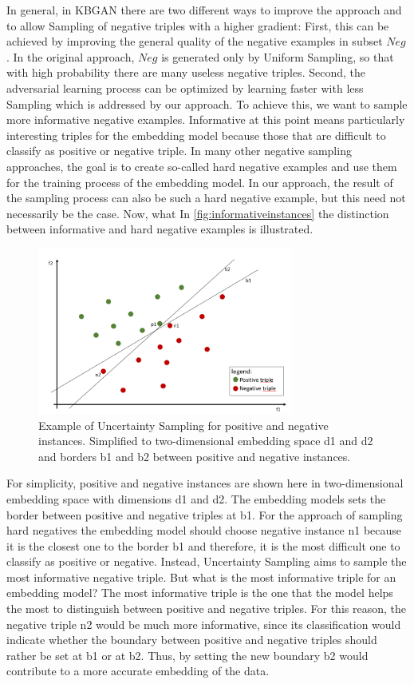 In general, in \ac{KBGAN} there are two different ways to improve the approach and to allow Sampling of negative triples with a higher gradient:
First, this can be achieved by improving the general quality of the negative examples in subset $Neg$.
In the original approach, $Neg$ is generated only by Uniform Sampling, so that with high probability there are many useless negative triples.
Second, the adversarial learning process can be optimized by learning faster with less Sampling which is addressed by our approach.
To achieve this, we want to sample more informative negative examples.
Informative at this point means particularly interesting triples for the embedding model because those that are difficult to classify as positive or negative triple.
In many other negative sampling approaches, the goal is to create so-called hard negative examples and use them for the training process of the embedding model. 
In our approach, the result of the sampling process can also be such a hard negative example, but this need not necessarily be the case.
Now, what 
In \autoref{fig:informativeinstances} the distinction between informative and hard negative examples is illustrated.
\begin{figure}[t]
  \centering
    \includegraphics[width=0.75\textwidth]{figures/informative_instances.PNG}
  \caption{Example of Uncertainty Sampling for positive and negative instances. Simplified to two-dimensional embedding space d1 and d2 and borders b1 and b2 between positive and negative instances.}
  \label{fig:informativeinstances}
\end{figure}
For simplicity, positive and negative instances are shown here in two-dimensional embedding space with dimensions d1 and d2.
The embedding models sets the border between positive and negative triples at b1.
For the approach of sampling hard negatives the embedding model should choose negative instance n1 because it is the closest one to the border b1 and therefore, it is the most difficult one to classify as positive or negative.
Instead, Uncertainty Sampling aims to sample the most informative negative triple.
But what is the most informative triple for an embedding model?
The most informative triple is the one that the model helps the most to distinguish between positive and negative triples.
For this reason, the negative triple n2 would be much more informative, since its classification would indicate whether the boundary between positive and negative triples should rather be set at b1 or at b2.
Thus, by setting the new boundary b2 would contribute to a more accurate embedding of the data.